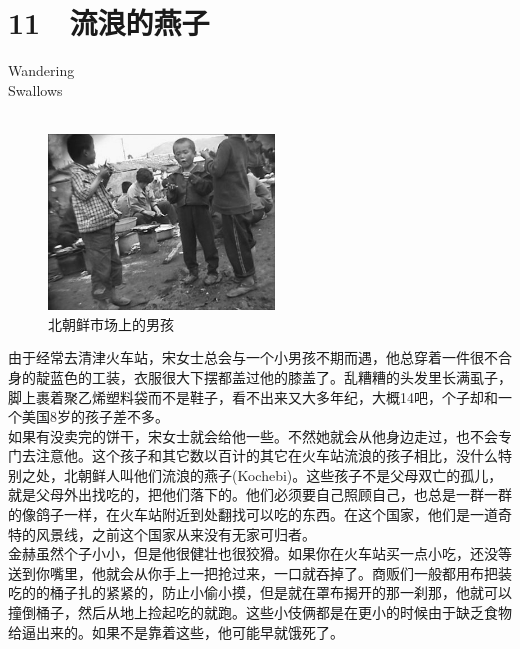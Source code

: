 \fancyhead[RO]{{\tiny{\textcolor{Gray}{\FA \ }}}\thepage}
\fancyhead[LE]{{\tiny{\textcolor{Gray}{\FA \ }}}\thepage}
\fancyfoot[LE,RO]{}
\fancyfoot[LO,CE]{}
\fancyfoot[CO,RE]{}
\chapter*{11 {\FA } 流浪的燕子}
\vspace{5mm}
\begin{flushright}
	\textcolor{PinYinColor}{\EN \huge{Wandering\\
	Swallows\\
	\ \\}}
\end{flushright}
\begin{figure}[!htbp]
	\centering
	\includegraphics[width=6cm]{./Chapters/Images/11.jpg}
	\caption*{北朝鲜市场上的男孩}
\end{figure}


由于经常去清津火车站，宋女士总会与一个小男孩不期而遇，他总穿着一件很不合身的靛蓝色的工装，衣服很大下摆都盖过他的膝盖了。乱糟糟的头发里长满虱子，脚上裹着聚乙烯塑料袋而不是鞋子，看不出来又大多年纪，大概14吧，个子却和一个美国8岁的孩子差不多。\\

如果有没卖完的饼干，宋女士就会给他一些。不然她就会从他身边走过，也不会专门去注意他。这个孩子和其它数以百计的其它在火车站流浪的孩子相比，没什么特别之处，北朝鲜人叫他们流浪的燕子(Kochebi)。这些孩子不是父母双亡的孤儿，就是父母外出找吃的，把他们落下的。他们必须要自己照顾自己，也总是一群一群的像鸽子一样，在火车站附近到处翻找可以吃的东西。在这个国家，他们是一道奇特的风景线，之前这个国家从来没有无家可归者。\\

金赫虽然个子小小，但是他很健壮也很狡猾。如果你在火车站买一点小吃，还没等送到你嘴里，他就会从你手上一把抢过来，一口就吞掉了。商贩们一般都用布把装吃的的桶子扎的紧紧的，防止小偷小摸，但是就在罩布揭开的那一刹那，他就可以撞倒桶子，然后从地上捡起吃的就跑。这些小伎俩都是在更小的时候由于缺乏食物给逼出来的。如果不是靠着这些，他可能早就饿死了。\\

